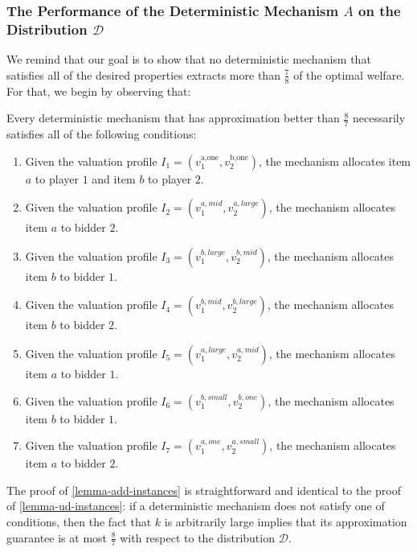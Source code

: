 \subsubsection[The Performance of the Deterministic Mechanism A on the "Hard" Distribution D]{The Performance of the Deterministic Mechanism $A$ on the  Distribution $\mathcal D$}\label{subsubsec-performance-add}
We remind that our goal is to show that no deterministic mechanism that satisfies all of the desired properties extracts more than $\frac{7}{8}$ of the optimal welfare. For that, we begin by observing that:
\begin{lemma}\label{lemma-add-instances}
Every deterministic mechanism that has approximation better than $\frac{8}{7}$ necessarily satisfies all of the following conditions:
\begin{enumerate}
    \item Given the valuation profile $I_1 = (v_1^{\text{a,one}}, v_2^{\text{b,one}})$, the mechanism
    allocates item $a$ to player $1$ and item $b$ to player $2$. \label{condi-1-add}
\item Given the valuation profile $I_2 = (v_1^{a,mid}, v_2^{a,large})$, the mechanism allocates item $a$ to bidder $2$. \label{condi-2-add}

    \item Given the valuation profile $I_3 = (v_1^{b,large}, v_2^{b,mid})$, the mechanism allocates item $b$  to bidder $1$.
    \label{condi-3-add}
\item Given the valuation profile $I_4 = (v_1^{b,mid}, v_2^{b,large})$, the mechanism allocates item $b$ to bidder $2$. \label{condi-4-add}
\item Given the valuation profile $I_5 = (v_1^{a,large}, v_2^{a,mid})$, the mechanism allocates item $a$ to bidder $1$. \label{condi-5-add}
\item Given the valuation profile $I_6 = (v_1^{b,small}, v_2^{b,one})$, the mechanism allocates item $b$ to bidder $1$. \label{condi-6-add}
\item Given the valuation profile $I_7 = (v_1^{a,one}, v_2^{a,small})$, the mechanism allocates item $a$ to bidder $2$. 
\end{enumerate}
\end{lemma}
The proof of \cref{lemma-add-instances} is straightforward and identical to the proof of \cref{lemma-ud-instances}: if a deterministic mechanism does not satisfy one of conditions, then the fact that $k$ is arbitrarily large implies that its approximation guarantee  is at most $\frac{8}{7}$ with respect to the distribution $\mathcal D$. 
